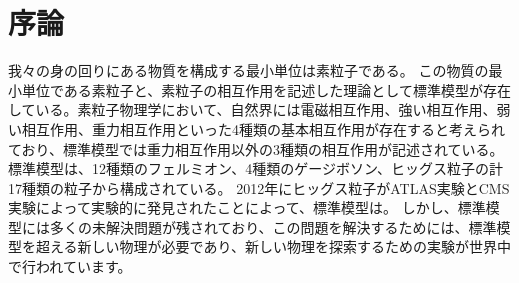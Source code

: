 \chapter{序論}
我々の身の回りにある物質を構成する最小単位は素粒子である。
この物質の最小単位である素粒子と、素粒子の相互作用を記述した理論として標準模型が存在している。素粒子物理学において、自然界には電磁相互作用、強い相互作用、弱い相互作用、重力相互作用といった4種類の基本相互作用が存在すると考えられており、標準模型では重力相互作用以外の3種類の相互作用が記述されている。
標準模型は、12種類のフェルミオン、4種類のゲージボソン、ヒッグス粒子の計17種類の粒子から構成されている。
2012年にヒッグス粒子がATLAS実験とCMS実験によって実験的に発見されたことによって、標準模型は。
しかし、標準模型には多くの未解決問題が残されており、この問題を解決するためには、標準模型を超える新しい物理が必要であり、新しい物理を探索するための実験が世界中で行われています。


